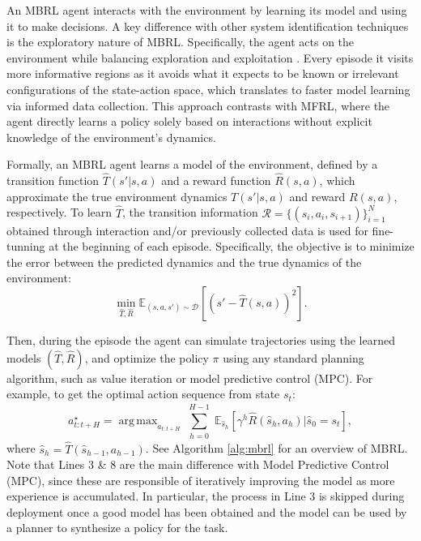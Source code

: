 \documentclass[Afour,sageh,times]{sagej}
\DeclareMathOperator*{\argmax}{arg\,max}
\theoremstyle{lemma}
\begin{document}
An MBRL agent interacts with the environment by learning its model and using it to make decisions. A key difference with other system identification techniques is the exploratory nature of MBRL. Specifically, the agent acts on the environment while balancing exploration and exploitation \cite[]{sutton2018reinforcement}. Every episode it visits more informative regions as it avoids what it expects to be known or irrelevant configurations of the state-action space, which translates to faster model learning via informed data collection. This approach contrasts with MFRL, where the agent directly learns a policy solely based on interactions without explicit knowledge of the environment’s dynamics.

Formally, an MBRL agent learns a model of the environment, defined by a transition function \( \hat{T}(s' | s, a) \) and a reward function \( \hat{R}(s, a) \), which approximate the true environment dynamics \( T(s' | s, a) \) and reward \( R(s, a) \), respectively. To learn $\hat{T}$, %
the transition information $\mathcal{R} = \{(s_i, a_i, s_{i+1})\}_{i=1}^N$ obtained through interaction and/or previously collected data is used for fine-tunning at the beginning of each episode. Specifically, the objective is to minimize the error between the predicted dynamics and the true dynamics of the environment:
\begin{equation}
\min_{\hat{T}, \hat{R}} \mathbb{E}_{(s, a, s') \sim \mathcal{D}} \left[ \left( s' - \hat{T}(s, a) \right)^2 \right].
\end{equation}


Then, during the episode the agent can simulate trajectories using the learned models \( (\hat{T}, \hat{R}) \), and optimize the policy \( \pi \) using any standard planning algorithm, such as value iteration or model predictive control (MPC). For example, to get the optimal action sequence from state $s_t$: 
\begin{equation}
    a^\star_{t:t+H} = \argmax_{a_{t:t+H}} \sum_{\substack{h=0}}^{\substack{H-1}} \mathbb{E}_{\hat{s}_{h}} [\gamma^h \hat{R}(\hat{s}_{h}, a_{h}) | \hat{s}_0 = s_t],
\end{equation}
where $\hat{s}_{h} = \hat{T}(\hat{s}_{h-1}, a_{h-1})$. See Algorithm \ref{alg:mbrl} for an overview of MBRL. Note that Lines 3 \& 8 are the main difference with Model Predictive Control (MPC), since these are responsible of iteratively improving the model as more experience is accumulated. In particular, the process in Line 3 is skipped during deployment once a good model has been obtained and the model can be used by a planner to synthesize a policy for the task.
\end{document}
